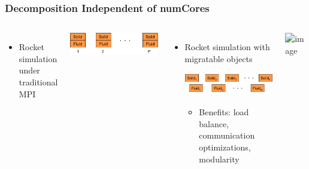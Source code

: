 \begin{frame}[t]
\frametitle{Decomposition Independent of numCores}
  \begin{columns}
    \begin{itemize}
      \item Rocket simulation under traditional MPI
    \end{itemize}
    \begin{center} \includegraphics[width=.6\textwidth]{figures/rocket_mpi} \end{center}
    \pause
    \begin{itemize}
      \item Rocket simulation with migratable objects
      \begin{center} \includegraphics[width=.6\textwidth]{figures/rocket_charm} \end{center}
      \begin{itemize}
        \item Benefits: load balance, communication optimizations, modularity
      \end{itemize}
    \end{itemize}
     {
    \vfill
    \begin{center} \includegraphics<0->[width=\textwidth]{figures/rocket.png} \end{center}
    \vfill
    }
  \end{columns}
\end{frame}





